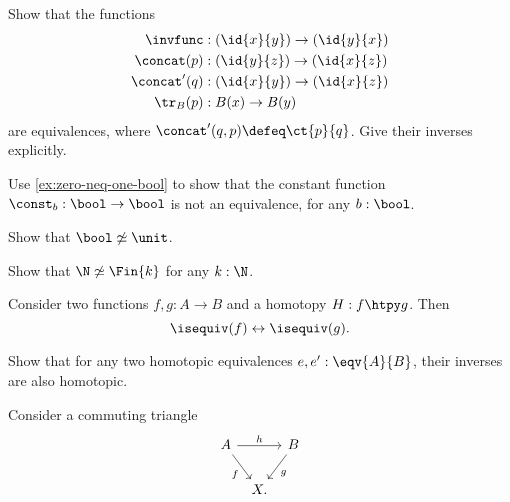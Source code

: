 \begin{exercises}
  \exitem \label{ex:equiv_grpd_ops}Show that the functions
  \begin{align*}
    \invfunc & :(\id{x}{y})\to(\id{y}{x}) \\
    \concat(p) & : (\id{y}{z})\to(\id{x}{z}) \\
    \concat'(q) & : (\id{x}{y}) \to (\id{x}{z}) \\
    \tr_B(p) & :B(x)\to B(y)
  \end{align*}
  are equivalences, where $\concat'(q,p)\defeq \ct{p}{q}$. Give their inverses explicitly.
  \exitem
  \begin{subexenum}
  \item Use \cref{ex:zero-neq-one-bool} to show that the constant function $\const_b:\bool\to\bool$ is not an equivalence, for any $b:\bool$.
  \item Show that $\bool\not\simeq \unit$.
  \item Show that $\N\not\simeq \Fin{k}$ for any $k:\N$. 
  \end{subexenum}
  \exitem
  \begin{subexenum}
  \item \label{ex:htpy_equiv} Consider two functions $f,g:A\to B$ and a homotopy $H:f\htpy g$. Then
    \begin{equation*}
      \isequiv(f)\leftrightarrow\isequiv(g).
    \end{equation*}
  \item Show that for any two homotopic equivalences $e,e':\eqv{A}{B}$, their inverses are also homotopic.
  \end{subexenum}
  \exitem \label{ex:3_for_2}
  Consider a commuting triangle
  \begin{equation*}
    \begin{tikzcd}[column sep=tiny]
      A \arrow[rr,"h"] \arrow[dr,swap,"f"] & & B \arrow[dl,"g"] \\
      & X.
    \end{tikzcd}

\end{equation*}
\end{exercises}
